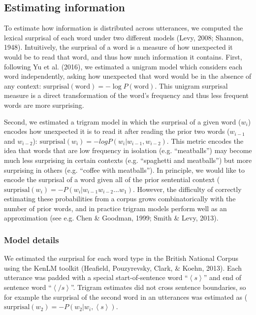 \documentclass[10pt, letterpaper]{article}
\begin{document}
\hypertarget{estimating-information}{%
\subsection{Estimating information}\label{estimating-information}}

To estimate how information is distributed across utterances, we
computed the lexical surprisal of each word under two different models
(Levy, 2008; Shannon, 1948). Intuitively, the surprisal of a word is a
measure of how unexpected it would be to read that word, and thus how
much information it contains. First, following Yu et al. (2016), we
estimated a unigram model which considers each word independently,
asking how unexpected that word would be in the absence of any context:
\(\text{surprisal}(\text{word}) = -\log P(\text{word})\). This unigram
surprisal measure is a direct transformation of the word's frequency and
thus less frequent words are more surprising.

Second, we estimated a trigram model in which the surprisal of a given
word (\(w_i\)) encodes how unexpected it is to read it after reading the
prior two words (\(w_{i-1}\) and \(w_{i-2}\)):
\(\text{surprisal}(w_{i}) = -log P(w_i|w_{i-1},w_{i-2})\). This metric
encodes the idea that words that are low frequency in isolation (e.g.
``meatballs'') may become much less surprising in certain contexts (e.g.
``spaghetti and meatballs'') but more surprising in others (e.g.
``coffee with meatballs''). In principle, we would like to encode the
surprisal of a word given all of the prior sentential context
(\(\text{surprisal}(w_{i}) = -P(w_i|w_{i-1}w_{i-2}...w_{1})\). However,
the difficulty of correctly estimating these probabilities from a corpus
grows combinatorically with the number of prior words, and in practice
trigram models perform well as an approximation (see e.g. Chen \&
Goodman, 1999; Smith \& Levy, 2013).

\hypertarget{model-details}{%
\subsubsection{Model details}\label{model-details}}

We estimated the surprisal for each word type in the British National
Corpus using the KenLM toolkit (Heafield, Pouzyrevsky, Clark, \& Koehn,
2013). Each utterance was padded with a special start-of-sentence word
``\(\left<s\right>\)'' and end of sentence word ``\(\left</s\right>\)''.
Trigram estimates did not cross sentence boundaries, so for example the
surprisal of the second word in an utterances was estimated as
(\(\text{surprisal}(w_{2}) = -P(w_2|w_{i},\left<s\right>)\).
\end{document}
